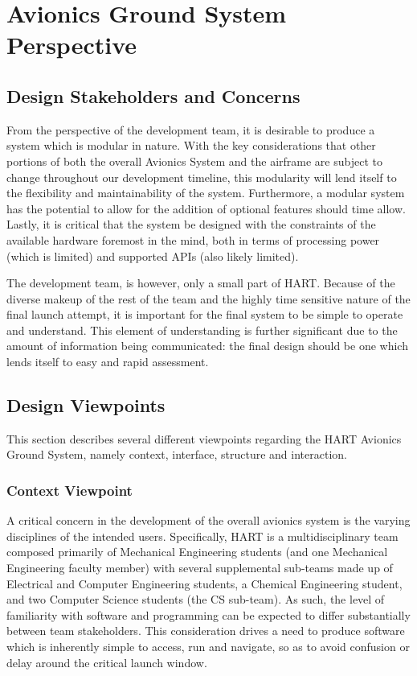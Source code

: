 \documentclass[journal,10pt,onecolumn,compsoc]{IEEEtran}
\begin{document}
\newpage


\section{Avionics Ground System Perspective}
	\subsection{Design Stakeholders and Concerns}
		\noindent From the perspective of the development team, it is desirable to produce a system which is modular in nature.
		With the key considerations that other portions of both the overall Avionics System and the airframe are subject to change throughout our development timeline, this modularity will lend itself to the flexibility and maintainability of the system.
		Furthermore, a modular system has the potential to allow for the addition of optional features should time allow.
		Lastly, it is critical that the system be designed with the constraints of the available hardware foremost in the mind, both in terms of processing power (which is limited) and supported APIs (also likely limited).
		
		\noindent The development team, is however, only a small part of HART.
		Because of the diverse makeup of the rest of the team and the highly time sensitive nature of the final launch attempt, it is important for the final system to be simple to operate and understand.
		This element of understanding is further significant due to the amount of information being communicated: the final design should be one which lends itself to easy and rapid assessment.

	\subsection{Design Viewpoints}
		\noindent This section describes several different viewpoints regarding the HART Avionics Ground System, namely context, interface, structure and interaction.

		\subsubsection{Context Viewpoint}
			\noindent A critical concern in the development of the overall avionics system is the varying disciplines of the intended users. 
			Specifically, HART is a multidisciplinary team composed primarily of Mechanical Engineering students (and one Mechanical Engineering faculty member) with several supplemental sub-teams made up of Electrical and Computer Engineering students, a Chemical Engineering student, and two Computer Science students (the CS sub-team).
			As such, the level of familiarity with software and programming can be expected to differ substantially between team stakeholders.
			This consideration drives a need to produce software which is inherently simple to access, run and navigate, so as to avoid confusion or delay around the critical launch window. 
\end{document}
